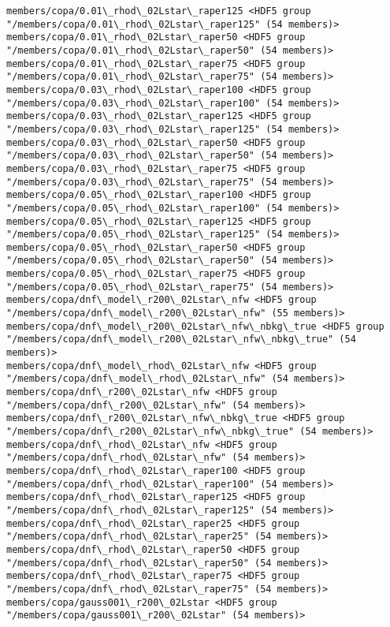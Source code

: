 \documentclass[11pt]{article}
\begin{document}
\begin{Verbatim}[commandchars=\\\{\}]
members/copa/0.01\_rhod\_02Lstar\_raper125 <HDF5 group "/members/copa/0.01\_rhod\_02Lstar\_raper125" (54 members)>
members/copa/0.01\_rhod\_02Lstar\_raper50 <HDF5 group "/members/copa/0.01\_rhod\_02Lstar\_raper50" (54 members)>
members/copa/0.01\_rhod\_02Lstar\_raper75 <HDF5 group "/members/copa/0.01\_rhod\_02Lstar\_raper75" (54 members)>
members/copa/0.03\_rhod\_02Lstar\_raper100 <HDF5 group "/members/copa/0.03\_rhod\_02Lstar\_raper100" (54 members)>
members/copa/0.03\_rhod\_02Lstar\_raper125 <HDF5 group "/members/copa/0.03\_rhod\_02Lstar\_raper125" (54 members)>
members/copa/0.03\_rhod\_02Lstar\_raper50 <HDF5 group "/members/copa/0.03\_rhod\_02Lstar\_raper50" (54 members)>
members/copa/0.03\_rhod\_02Lstar\_raper75 <HDF5 group "/members/copa/0.03\_rhod\_02Lstar\_raper75" (54 members)>
members/copa/0.05\_rhod\_02Lstar\_raper100 <HDF5 group "/members/copa/0.05\_rhod\_02Lstar\_raper100" (54 members)>
members/copa/0.05\_rhod\_02Lstar\_raper125 <HDF5 group "/members/copa/0.05\_rhod\_02Lstar\_raper125" (54 members)>
members/copa/0.05\_rhod\_02Lstar\_raper50 <HDF5 group "/members/copa/0.05\_rhod\_02Lstar\_raper50" (54 members)>
members/copa/0.05\_rhod\_02Lstar\_raper75 <HDF5 group "/members/copa/0.05\_rhod\_02Lstar\_raper75" (54 members)>
members/copa/dnf\_model\_r200\_02Lstar\_nfw <HDF5 group "/members/copa/dnf\_model\_r200\_02Lstar\_nfw" (55 members)>
members/copa/dnf\_model\_r200\_02Lstar\_nfw\_nbkg\_true <HDF5 group "/members/copa/dnf\_model\_r200\_02Lstar\_nfw\_nbkg\_true" (54 members)>
members/copa/dnf\_model\_rhod\_02Lstar\_nfw <HDF5 group "/members/copa/dnf\_model\_rhod\_02Lstar\_nfw" (54 members)>
members/copa/dnf\_r200\_02Lstar\_nfw <HDF5 group "/members/copa/dnf\_r200\_02Lstar\_nfw" (54 members)>
members/copa/dnf\_r200\_02Lstar\_nfw\_nbkg\_true <HDF5 group "/members/copa/dnf\_r200\_02Lstar\_nfw\_nbkg\_true" (54 members)>
members/copa/dnf\_rhod\_02Lstar\_nfw <HDF5 group "/members/copa/dnf\_rhod\_02Lstar\_nfw" (54 members)>
members/copa/dnf\_rhod\_02Lstar\_raper100 <HDF5 group "/members/copa/dnf\_rhod\_02Lstar\_raper100" (54 members)>
members/copa/dnf\_rhod\_02Lstar\_raper125 <HDF5 group "/members/copa/dnf\_rhod\_02Lstar\_raper125" (54 members)>
members/copa/dnf\_rhod\_02Lstar\_raper25 <HDF5 group "/members/copa/dnf\_rhod\_02Lstar\_raper25" (54 members)>
members/copa/dnf\_rhod\_02Lstar\_raper50 <HDF5 group "/members/copa/dnf\_rhod\_02Lstar\_raper50" (54 members)>
members/copa/dnf\_rhod\_02Lstar\_raper75 <HDF5 group "/members/copa/dnf\_rhod\_02Lstar\_raper75" (54 members)>
members/copa/gauss001\_r200\_02Lstar <HDF5 group "/members/copa/gauss001\_r200\_02Lstar" (54 members)>

\end{Verbatim}
\end{document}
